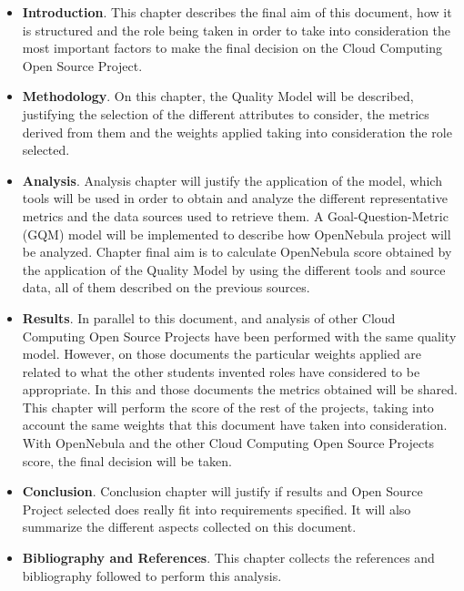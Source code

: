 \documentclass[11pt]{article}
\begin{document}
\begin{itemize}\itemsep0pt
\item{\textbf{Introduction}}. This chapter describes the final aim of this document, how it is structured and the role being taken in order to take into consideration the most important factors to make the final decision on the Cloud Computing Open Source Project.
\item{\textbf{Methodology}}. On this chapter, the Quality Model will be described, justifying the selection of the different attributes to consider, the metrics derived from them and the weights applied taking into consideration the role selected.
\item{\textbf{Analysis}}. Analysis chapter will justify the application of the model, which tools will be used in order to obtain and analyze the different representative metrics and the data sources used to retrieve them. A Goal-Question-Metric (GQM) model will be implemented to describe how OpenNebula project will be analyzed. Chapter final aim is to calculate OpenNebula score obtained by the application of the Quality Model by using the different tools and source data, all of them described on the previous sources.
\item{\textbf{Results}}. In parallel to this document, and analysis of other Cloud Computing Open Source Projects have been performed with the same quality model. However, on those documents the particular weights applied are related to what the other students invented roles have considered to be appropriate. In this and those documents the metrics obtained will be shared. This chapter will perform the score of the rest of the projects, taking into account the same weights that this document have taken into consideration. With OpenNebula and the other Cloud Computing Open Source Projects score, the final decision will be taken.
\item{\textbf{Conclusion}}. Conclusion chapter will justify if results and Open Source Project selected does really fit into requirements specified. It will also summarize the different aspects collected on this document.
\item{\textbf{Bibliography and References}}. This chapter collects the references and bibliography followed to perform this analysis.
\end{itemize}
\end{document}
